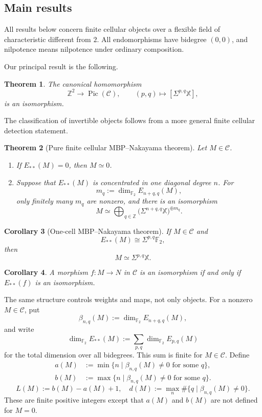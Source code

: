 \documentclass[11pt]{amsart}
\numberwithin{equation}{section}
\newtheorem{theorem}{Theorem}[section]
\newtheorem{corollary}[theorem]{Corollary}
\theoremstyle{definition}
\theoremstyle{remark}
\DeclareMathOperator{\Pic}{Pic}
\newcommand{\MBP}{\mathrm{MBP}}
\newcommand{\F}{\mathbb F_2}
\newcommand{\X}{\mathbb X}
\newcommand{\C}{\mathcal C}
\begin{document}
\subsection*{Main results}

All results below concern finite cellular objects over a flexible field of
characteristic different from $2$.  All endomorphisms have bidegree $(0,0)$,
and nilpotence means nilpotence under ordinary composition. 

Our principal result is the following.

\begin{theorem}\label{thm:main-picard}
The canonical homomorphism
\[
  \mathbb Z^2\longrightarrow\Pic(\C),
  \qquad
  (p,q)\longmapsto[\Sigma^{p,q}\X],
\]
is an isomorphism.
\end{theorem}

The classification of invertible objects follows from a more general finite
cellular detection statement.

\begin{theorem}[Pure finite cellular $\MBP$--Nakayama theorem]
\label{thm:pure-nakayama}
Let $M\in\C$.
\begin{enumerate}[label=\textup{(\roman*)}]
\item If $E_{**}(M)=0$, then $M\simeq0$.
\item Suppose that $E_{**}(M)$ is concentrated in one diagonal degree $n$.
For
\[
  m_q:=\dim_{\F}E_{n+q,q}(M),
\]
only finitely many $m_q$ are nonzero, and there is an isomorphism
\[
  M\simeq
  \bigoplus_{q\in\mathbb Z}
  \bigl(\Sigma^{n+q,q}\X\bigr)^{\oplus m_q}.
\]
\end{enumerate}
\end{theorem}

\begin{corollary}[One-cell $\MBP$--Nakayama theorem]
\label{cor:one-cell-nakayama}
If $M\in\C$ and
\[
  E_{**}(M)\cong\Sigma^{p,q}\F,
\]
then
\[
  M\simeq\Sigma^{p,q}\X.
\]
\end{corollary}

\begin{corollary}
\label{cor:equivalence-detection}
A morphism $f\colon M\to N$ in $\C$ is an isomorphism if and only if
$E_{**}(f)$ is an isomorphism.
\end{corollary}

The same structure controls weights and maps, not only objects.  For a
nonzero $M\in\C$, put
\[
  \beta_{n,q}(M):=\dim_{\F}E_{n+q,q}(M),
\]
and write
\[
  \dim_{\F}E_{**}(M):=\sum_{p,q}\dim_{\F}E_{p,q}(M)
\]
for the total dimension over all bidegrees.  This sum is finite for
$M\in\C$.  Define
\begin{equation}\label{eq:homological-width-data}
\begin{aligned}
  a(M)&:=\min\{n\mid \beta_{n,q}(M)\ne0\text{ for some }q\},\\
  b(M)&:=\max\{n\mid \beta_{n,q}(M)\ne0\text{ for some }q\}.
\end{aligned}
\end{equation}
\[
  L(M):=b(M)-a(M)+1,
  \quad
  d(M):=\max_n\#\{q\mid\beta_{n,q}(M)\ne0\}.
\]
These are finite positive integers except that $a(M)$ and $b(M)$ are not
defined for $M=0$.
\end{document}
